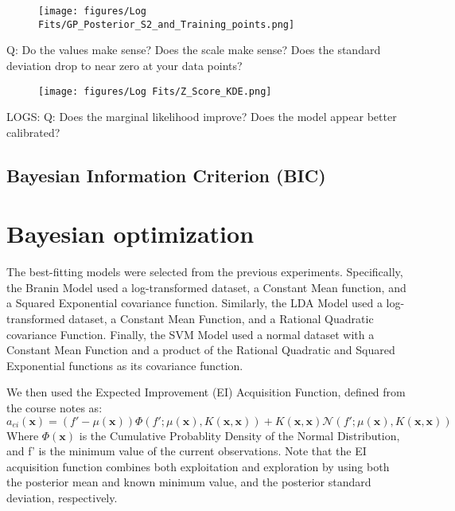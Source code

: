 \documentclass[11pt]{article}
\numberwithin{equation}{section}
\begin{document}
\begin{figure}[H]
  \centering
  \texttt{[image: figures/Log Fits/GP\_Posterior\_S2\_and\_Training\_points.png]}
  \caption{}
  \label{}
\end{figure}
Q: Do the values make sense? Does the scale make sense? Does the standard
deviation drop to near zero at your data points?

\begin{figure}[H]
  \centering
  \texttt{[image: figures/Log Fits/Z\_Score\_KDE.png]}
  \caption{}
  \label{}
\end{figure}


LOGS:
Q:  Does the
marginal likelihood improve? Does the model appear better calibrated?

\subsection*{Bayesian Information Criterion (BIC)}

\section*{Bayesian optimization}

The best-fitting models were selected from the previous experiments. 
Specifically, the Branin Model used a log-transformed dataset, a Constant Mean function, and a Squared Exponential covariance function.
Similarly, the LDA Model used a log-transformed dataset, a Constant Mean Function, and a Rational Quadratic covariance Function.
Finally, the SVM Model used a normal dataset with a Constant Mean Function and a product of the Rational Quadratic and Squared Exponential functions as its covariance function.

We then used the Expected Improvement (EI) Acquisition Function, defined from the course notes as:
\begin{equation}
  a_{ei}(\bm{x}) = (f' - \mu(\bm{x}))\Phi(f';\mu(\bm{x}),K(\bm{x},\bm{x})) + K(\bm{x},\bm{x})\mathcal{N}(f';\mu(\bm{x}),K(\bm{x},\bm{x}))
  \label{eq:Expected Improvement}
\end{equation}
Where $\Phi(\bm{x})$ is the Cumulative Probablity Density of the Normal Distribution, and f' is the minimum value of the current observations.
Note that the EI acquisition function combines both exploitation and exploration by using both the posterior mean and known minimum value, and the posterior standard deviation, respectively. 
\end{document}
